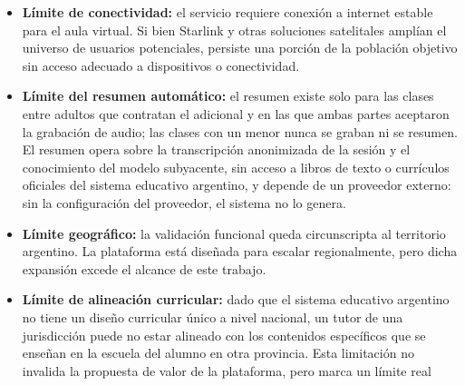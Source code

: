 \begin{itemize}
          el documento no esté ya registrado. La imagen no sale del
          servidor ni se conserva, y no hay revisión manual del
          \gls{dni}, por lo que se acepta el riesgo de una lectura
          errónea en fotos de baja calidad (ADR-M1-01, ADR-M1-08). La
          revisión manual existe para la credencial académica y para el
          \gls{cap}. La verificación automatizada de antecedentes vía
          \gls{api} queda fuera de alcance; la reemplaza la exigencia y
          revisión manual del \gls{cap} tramitado por el tutor vía Mi
          Argentina, obligatorio y vigente (doce meses desde su emisión)
          solo para dar clases a menores. Se acepta el riesgo residual de
          un certificado adulterado o mal evaluado, ya que la
          verificación de su firma digital queda diferida.
    \item \textbf{Límite de conectividad:} el servicio requiere conexión a
          internet estable para el aula virtual. Si bien Starlink y otras
          soluciones satelitales amplían el universo de usuarios
          potenciales, persiste una porción de la población objetivo sin
          acceso adecuado a dispositivos o conectividad.
    \item \textbf{Límite del resumen automático:} el resumen existe solo
          para las clases entre adultos que contratan el adicional y en
          las que ambas partes aceptaron la grabación de audio; las clases
          con un menor nunca se graban ni se resumen. El resumen opera
          sobre la transcripción anonimizada de la sesión y el
          conocimiento del modelo subyacente, sin acceso a libros de texto
          o currículos oficiales del sistema educativo argentino, y
          depende de un proveedor externo: sin la configuración del
          proveedor, el sistema no lo genera.
    \item \textbf{Límite geográfico:} la validación funcional
          queda circunscripta al territorio argentino. La plataforma está
          diseñada para escalar regionalmente, pero dicha expansión
          excede el alcance de este trabajo.
    \item \textbf{Límite de alineación curricular:} dado que el sistema
          educativo argentino no tiene un diseño curricular único a nivel
          nacional, un tutor de una jurisdicción puede no estar alineado
          con los contenidos específicos que se enseñan en la escuela del
          alumno en otra provincia. Esta limitación no invalida la
          propuesta de valor de la plataforma, pero marca un límite real

\end{itemize}
